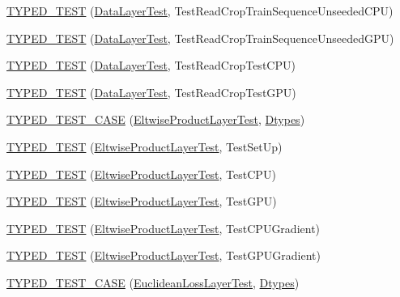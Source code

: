 \begin{DoxyCompactItemize}
\item 
\hyperlink{namespacecaffe_a1d3359b4b4a2379d10c6c028cfcb063a}{T\+Y\+P\+E\+D\+\_\+\+T\+E\+S\+T} (\hyperlink{classcaffe_1_1_data_layer_test}{Data\+Layer\+Test}, Test\+Read\+Crop\+Train\+Sequence\+Unseeded\+C\+P\+U)
\item 
\hyperlink{namespacecaffe_a365ff13b3bde406b767d692d9d3c9ac7}{T\+Y\+P\+E\+D\+\_\+\+T\+E\+S\+T} (\hyperlink{classcaffe_1_1_data_layer_test}{Data\+Layer\+Test}, Test\+Read\+Crop\+Train\+Sequence\+Unseeded\+G\+P\+U)
\item 
\hyperlink{namespacecaffe_acbd183203bf377728d9a227dfc326273}{T\+Y\+P\+E\+D\+\_\+\+T\+E\+S\+T} (\hyperlink{classcaffe_1_1_data_layer_test}{Data\+Layer\+Test}, Test\+Read\+Crop\+Test\+C\+P\+U)
\item 
\hyperlink{namespacecaffe_af952301728eb56b881168f2676f0f436}{T\+Y\+P\+E\+D\+\_\+\+T\+E\+S\+T} (\hyperlink{classcaffe_1_1_data_layer_test}{Data\+Layer\+Test}, Test\+Read\+Crop\+Test\+G\+P\+U)
\item 
\hyperlink{namespacecaffe_a04e02ce3082d15567b37089b36964de3}{T\+Y\+P\+E\+D\+\_\+\+T\+E\+S\+T\+\_\+\+C\+A\+S\+E} (\hyperlink{classcaffe_1_1_eltwise_product_layer_test}{Eltwise\+Product\+Layer\+Test}, \hyperlink{namespacecaffe_a131dc2be50f2f10e18450da61cde6b57}{Dtypes})
\item 
\hyperlink{namespacecaffe_ab49eec63cbbd091a43c710be9f09758c}{T\+Y\+P\+E\+D\+\_\+\+T\+E\+S\+T} (\hyperlink{classcaffe_1_1_eltwise_product_layer_test}{Eltwise\+Product\+Layer\+Test}, Test\+Set\+Up)
\item 
\hyperlink{namespacecaffe_a6e3d3d0557622b55b77cbb398ff06d6e}{T\+Y\+P\+E\+D\+\_\+\+T\+E\+S\+T} (\hyperlink{classcaffe_1_1_eltwise_product_layer_test}{Eltwise\+Product\+Layer\+Test}, Test\+C\+P\+U)
\item 
\hyperlink{namespacecaffe_a96f76a72281082a0987aebb499401b92}{T\+Y\+P\+E\+D\+\_\+\+T\+E\+S\+T} (\hyperlink{classcaffe_1_1_eltwise_product_layer_test}{Eltwise\+Product\+Layer\+Test}, Test\+G\+P\+U)
\item 
\hyperlink{namespacecaffe_aa19b7517e884e729e09334928101a0ca}{T\+Y\+P\+E\+D\+\_\+\+T\+E\+S\+T} (\hyperlink{classcaffe_1_1_eltwise_product_layer_test}{Eltwise\+Product\+Layer\+Test}, Test\+C\+P\+U\+Gradient)
\item 
\hyperlink{namespacecaffe_acbd69d4b58488d1435038ac91a18c1c0}{T\+Y\+P\+E\+D\+\_\+\+T\+E\+S\+T} (\hyperlink{classcaffe_1_1_eltwise_product_layer_test}{Eltwise\+Product\+Layer\+Test}, Test\+G\+P\+U\+Gradient)
\item 
\hyperlink{namespacecaffe_a4fe0982d1e0bd317401b1419bb66acc4}{T\+Y\+P\+E\+D\+\_\+\+T\+E\+S\+T\+\_\+\+C\+A\+S\+E} (\hyperlink{classcaffe_1_1_euclidean_loss_layer_test}{Euclidean\+Loss\+Layer\+Test}, \hyperlink{namespacecaffe_a131dc2be50f2f10e18450da61cde6b57}{Dtypes})

\end{DoxyCompactItemize}
